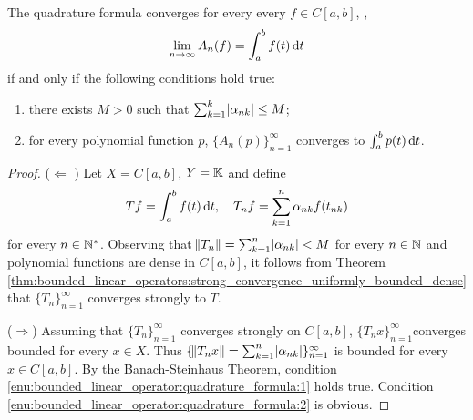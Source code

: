 \begin{thm}
The quadrature formula converges for every every $f \in C[a, b]$, \ie, 
\begin{equation*}
    \lim_{n \to \infty} A_n(f) = \int_{a}^{b} f(t) \mathop{}\!\mathrm{d} t
\end{equation*}
if and only if the following conditions hold true: 
\begin{enumerate}
    \item \label{enu:bounded_linear_operator:quadrature_formula:1}
    there exists $M > 0$ such that $\sum_{k=1}^{k} 
    \abs{\alpha_{nk}} \le M$; 
    \item \label{enu:bounded_linear_operator:quadrature_formula:2}
    for every polynomial function $p$, $\{ A_n(p) \}_{n=1}^{\infty}$ 
    converges to $\int_{a}^{b} p(t) \mathop{}\!\mathrm{d} t$. 
\end{enumerate}
\end{thm}
\begin{proof}
($\Leftarrow$ )
Let $X = C[a, b]$, $Y = \mathbb{K}$ and define 
\begin{equation*}
    Tf = \int_{a}^{b} f(t) \mathop{}\!\mathrm{d} t, \quad 
    T_n f = \sum_{k=1}^{n} \alpha_{nk} f(t_{nk}) 
\end{equation*}
for every $n \in \mathbb{N}^\ast$. 
Observing that $\norm{T_n} = \sum_{k=1}^{n} \abs{\alpha_{nk}} < M$ 
for every $n \in \mathbb{N}$ and polynomial functions are dense in $C[a, b]$, 
it follows from Theorem 
\ref{thm:bounded_linear_operators:strong_convergence_uniformly_bounded_dense}
that $\{ T_n \}_{n=1}^{\infty}$ converges strongly to $T$. 

($\Rightarrow$)
Assuming that $\{ T_n \}_{n=1}^{\infty}$ converges strongly on $C[a, b]$, 
$\{ T_n x \}_{n=1}^{\infty}$converges bounded for every $x \in X$. 
Thus $\{ \norm{T_n x} = \sum_{k=1}^{n} \abs{\alpha_{nk}} \}_{n=1}^{\infty}$ 
is bounded for every $x \in C[a, b]$. 
By the Banach-Steinhaus Theorem, condition 
\ref{enu:bounded_linear_operator:quadrature_formula:1} holds true. 
Condition \ref{enu:bounded_linear_operator:quadrature_formula:2} is obvious. 
\end{proof}


